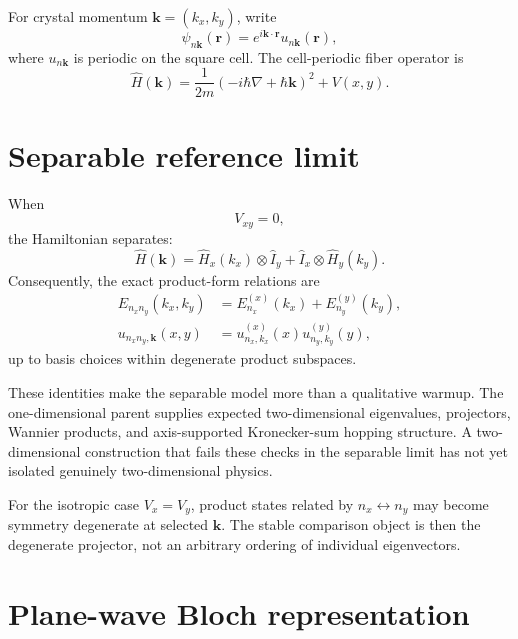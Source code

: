 For crystal momentum $\mathbf k=(k_x,k_y)$, write
\begin{equation}
    \psi_{n\mathbf k}(\mathbf r)
    =
    e^{i\mathbf k\cdot\mathbf r}
    u_{n\mathbf k}(\mathbf r),
\end{equation}
where $u_{n\mathbf k}$ is periodic on the square cell. The cell-periodic fiber
operator is
\begin{equation}
    \hat H(\mathbf k)
    =
    \frac{1}{2m}
    \left(-i\hbar\nabla+\hbar\mathbf k\right)^2
    +
    V(x,y).
\end{equation}

\section{Separable reference limit}

When
\begin{equation}
    V_{xy}=0,
\end{equation}
the Hamiltonian separates:
\begin{equation}
    \hat H(\mathbf k)
    =
    \hat H_x(k_x)
    \otimes
    \hat I_y
    +
    \hat I_x
    \otimes
    \hat H_y(k_y).
\end{equation}
Consequently, the exact product-form relations are
\begin{align}
    E_{n_xn_y}(k_x,k_y)
    &=
    E_{n_x}^{(x)}(k_x)
    +
    E_{n_y}^{(y)}(k_y),
    \\
    u_{n_xn_y,\mathbf k}(x,y)
    &=
    u_{n_x,k_x}^{(x)}(x)
    u_{n_y,k_y}^{(y)}(y),
\end{align}
up to basis choices within degenerate product subspaces.

These identities make the separable model more than a qualitative warmup. The
one-dimensional parent supplies expected two-dimensional eigenvalues,
projectors, Wannier products, and axis-supported Kronecker-sum hopping
structure. A two-dimensional
construction that fails these checks in the separable limit has not yet
isolated genuinely two-dimensional physics.

For the isotropic case $V_x=V_y$, product states related by
$n_x\leftrightarrow n_y$ may become symmetry degenerate at selected
$\mathbf k$. The stable comparison object is then the degenerate projector,
not an arbitrary ordering of individual eigenvectors.

\section{Plane-wave Bloch representation}

